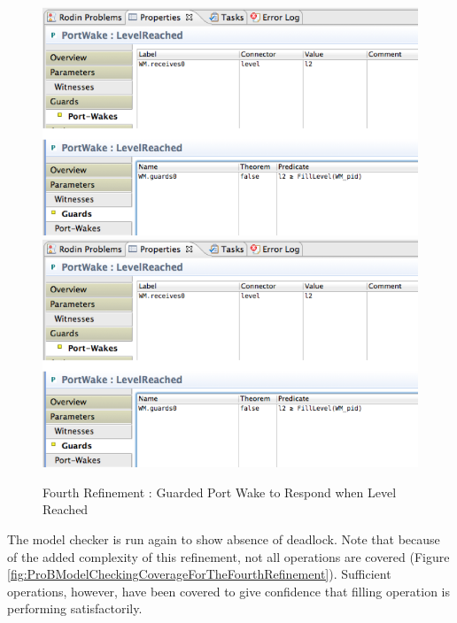  \begin{figure}[!htbp]
  \centering
  \ifplastex
  \includegraphics[width=1024]{figures/image47.png}
  \else
  \includegraphics[width=1\textwidth]{figures/image47.png}
  \fi
  \caption{Fourth Refinement : Guarded Port Wake to Respond when Level Reached}
  \label{fig:FourthRefinementGuardedPortWakeToRespondWhenLevelReached}
\end{figure}  
 
The model checker is run again to show absence of deadlock. Note that because of the added complexity of this refinement, not all operations are covered (Figure \ref{fig:ProBModelCheckingCoverageForTheFourthRefinement}). Sufficient operations, however, have been covered to give confidence that filling operation is performing satisfactorily.
 
